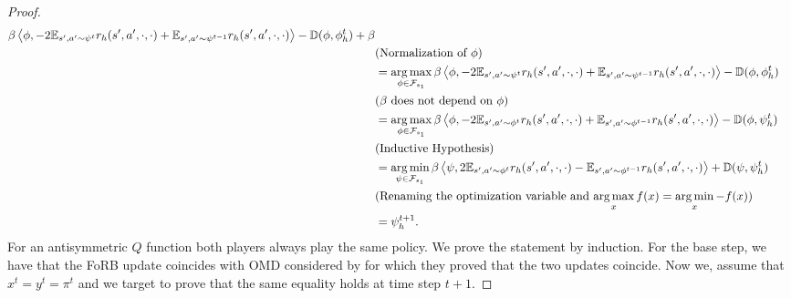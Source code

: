 \begin{proof}
\begin{align*}
            \beta \left\langle{\phi},{
            - 2 \mathbb{E}_{s',a' \sim \psi^t}r_h(s',a',\cdot,\cdot) +\mathbb{E}_{s',a' \sim \psi^{t-1}}r_h(s',a',\cdot,\cdot)}\right\rangle - \mathbb{D}(\phi, \phi_h^t) + \beta\\&\text{(Normalization of $\phi$)}\\
            &= \operatorname*{arg\,max}_{\phi \in \mathcal{F}_{s_1}} 
            \beta \left\langle{\phi},{
            - 2 \mathbb{E}_{s',a' \sim \psi^t}r_h(s',a',\cdot,\cdot) +\mathbb{E}_{s',a' \sim \psi^{t-1}}r_h(s',a',\cdot,\cdot)}\right\rangle - \mathbb{D}(\phi, \phi_h^t) \\&\text{($\beta$ does not depend on $\phi$)}\\
            &= \operatorname*{arg\,max}_{\phi \in \mathcal{F}_{s_1}} 
            \beta \left\langle{\phi},{
            - 2 \mathbb{E}_{s',a' \sim \phi^t}r_h(s',a',\cdot,\cdot) +\mathbb{E}_{s',a' \sim \phi^{t-1}}r_h(s',a',\cdot,\cdot)}\right\rangle - \mathbb{D}(\phi, \psi_h^t) \\&\text{(Inductive Hypothesis)}
            \\&= \operatorname*{arg\,min}_{\psi \in \mathcal{F}_{s_1}} 
            \beta \left\langle{\psi},{
            2 \mathbb{E}_{s',a' \sim \phi^t}r_h(s',a',\cdot,\cdot) - \mathbb{E}_{s',a' \sim \phi^{t-1}}r_h(s',a',\cdot,\cdot)}\right\rangle + \mathbb{D}(\psi, \psi_h^t) 
            \\&\text{(Renaming the optimization variable and $\operatorname*{arg\,max}_x f(x) = \operatorname*{arg\,min}_x - f(x)$)}
            \\
            & = \psi^{t+1}_h.
        \end{align*}
For an antisymmetric $Q$ function both players always play the same policy. We prove the statement by induction.
For the base step, we have that the FoRB update coincides with OMD considered by \cite{swamyminimaximalist} for which they proved that the two updates coincide.
Now we, assume that $x^t = y^t = \pi^t$ and we target to prove that the same equality holds at time step $t+1$.

\end{proof}
